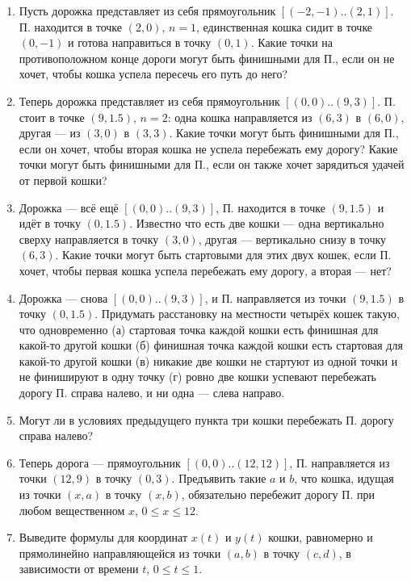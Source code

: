 \begin{enumerate}

\item Пусть дорожка представляет из себя прямоугольник $[(-2,-1)..(2,1)]$. П. находится в точке $(2,0)$, $n=1$, единственная кошка сидит в точке $(0,-1)$ и готова направиться в точку $(0,1)$. Какие точки на противоположном конце дороги могут быть финишными для П., если он не хочет, чтобы кошка успела пересечь его путь до него?

\item Теперь дорожка представляет из себя прямоугольник $[(0,0)..(9,3)]$. П. стоит в точке $(9,1.5)$, $n=2$: одна кошка направляется из $(6,3)$ в $(6,0)$, другая — из $(3,0)$ в $(3,3)$. Какие точки могут быть финишными для П., если он хочет, чтобы вторая кошка не успела перебежать ему дорогу? Какие точки могут быть финишными для П., если он также хочет зарядиться удачей от первой кошки?

\item Дорожка — всё ещё $[(0,0)..(9,3)]$, П. находится в точке $(9,1.5)$ и идёт в точку $(0,1.5)$. Известно что есть две кошки — одна вертикально сверху направляется в точку $(3,0)$, другая --- вертикально снизу в точку $(6,3)$. Какие точки могут быть стартовыми для этих двух кошек, если П. хочет, чтобы первая кошка успела перебежать ему дорогу, а вторая --- нет?

\item Дорожка — снова $[(0,0)..(9,3)]$, и П. направляется из точки $(9,1.5)$ в точку $(0,1.5)$. Придумать расстановку на местности четырёх кошек такую, что одновременно (а) стартовая точка каждой кошки есть финишная для какой-то другой кошки (б) финишная точка каждой кошки есть стартовая для какой-то другой кошки (в) никакие две кошки не стартуют из одной точки и не финишируют в одну точку (г) ровно две кошки успевают перебежать дорогу П. справа налево, и ни одна — слева направо.

\item Могут ли в условиях предыдущего пункта три кошки перебежать П. дорогу справа налево?

\item Теперь дорога — прямоугольник $[(0,0)..(12,12)]$, П. направляется из точки $(12,9)$ в точку $(0,3)$. Предъявить такие $a$ и $b$, что кошка, идущая из точки $(x,a)$ в точку $(x,b)$, обязательно перебежит дорогу П. при любом вещественном $x$, $0 \leq x \leq 12$.

\item Выведите формулы для координат $x(t)$ и $y(t)$ кошки, равномерно и прямолинейно направляющейся из точки $(a,b)$ в точку $(c,d)$, в зависимости от времени $t$, $0 \leq t \leq 1$.

\end{enumerate}